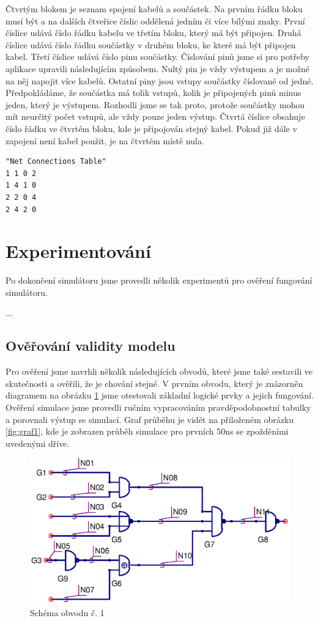 \documentclass[11pt,a4paper]{article}
\begin{document}
			Čtvrtým blokem je seznam spojení kabelů a součástek. Na prvním řádku bloku musí být  a na dalších čtveřice číslic oddělená jedním či více bílými znaky. První číslice udává číslo řádku kabelu ve třetím bloku, který má být připojen. Druhá číslice udává číslo řádku součástky v druhém bloku, ke které má být připojen kabel. Třetí číslice udává číslo pinu součástky. Číslování pinů jsme si pro potřeby aplikace upravili následujícím způsobem. Nultý pin je vždy výstupem a je možné na něj napojit více kabelů. Ostatní piny jsou vstupy součástky číslované od jedné. Předpokládáme, že součástka má tolik vstupů, kolik je připojených pinů minus jeden, který je výstupem. Rozhodli jsme se tak proto, protože součástky mohou mít neurčitý počet vstupů, ale vždy pouze jeden výstup. Čtvrtá číslice obsahuje číslo řádku ve čtvrtém bloku, kde je připojován stejný kabel. Pokud již dále v zapojení není kabel použit, je na čtvrtém místě nula.

\begin{lstlisting}[caption=Příklad bloku propojení]
"Net Connections Table"
1 1 0 2
1 4 1 0
2 2 0 4
2 4 2 0
\end{lstlisting}


	\section{Experimentování}
		Po dokončení simulátoru jsme provedli několik experimentů pro ověření fungování simulátoru.

		...

		\subsection{Ověřování validity modelu}
			\label{validity}
			Pro ověření jsme navrhli několik následujících obvodů, které jsme také sestavili ve skutečnosti a ověřili, že je chování stejné. V prvním obvodu, který je znázorněn diagramem na obrázku \ref{fig:scheme1} jsme otestovali základní logické prvky a jejich fungování. Ověření simulace jsme provedli ručním vypracováním pravděpodobnostní tabulky a porovnali výstup se simulací. Graf průběhu je vidět na přiloženém obrázku \ref{fig:graf1}, kde je zobrazen průběh simulace pro prvních 50ns se zpožděními uvedenými dříve.


			\begin{figure}[!htb]
				\centering
					\includegraphics[scale=.5]{input1.eps}
					\caption{Schéma obvodu č. 1}
					\label{fig:scheme1}
			\end{figure}
\end{document}

